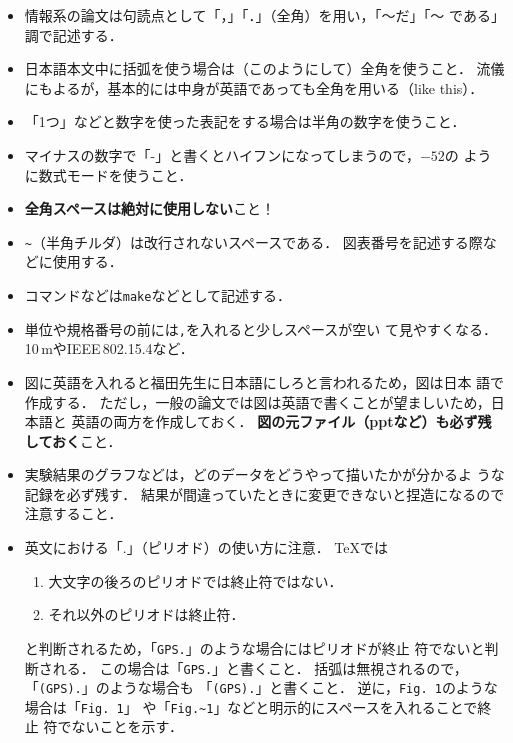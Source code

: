 \begin{itemize}
 \item 情報系の論文は句読点として「，」「．」（全角）を用い，「〜だ」「〜
       である」調で記述する．
 \item 日本語本文中に括弧を使う場合は（このようにして）全角を使うこと．
       流儀にもよるが，基本的には中身が英語であっても全角を用いる（like
       this）．
 \item 「1つ」などと数字を使った表記をする場合は半角の数字を使うこと．
 \item マイナスの数字で「-」と書くとハイフンになってしまうので，$-52$の
       ように数式モードを使うこと．
 \item \textbf{全角スペースは絶対に使用しない}こと！
 \item \texttt{\~}（半角チルダ）は改行されないスペースである．
       図表番号を記述する際などに使用する．
 \item コマンドなどは\texttt{make}などとして記述する．
 \item 単位や規格番号の前には\texttt{\yen ,}を入れると少しスペースが空い
       て見やすくなる．10\,mやIEEE\,802.15.4など．
 \item 図に英語を入れると福田先生に日本語にしろと言われるため，図は日本
       語で作成する．
       ただし，一般の論文では図は英語で書くことが望ましいため，日本語と
       英語の両方を作成しておく．
       \textbf{図の元ファイル（pptなど）も必ず残しておく}こと．
 \item 実験結果のグラフなどは，どのデータをどうやって描いたかが分かるよ
       うな記録を必ず残す．
       結果が間違っていたときに変更できないと捏造になるので注意すること．
 \item 英文における「.」（ピリオド）の使い方に注意．
       TeXでは
       \begin{enumerate}
        \item 大文字の後ろのピリオドでは終止符ではない．
        \item それ以外のピリオドは終止符．
       \end{enumerate}
       と判断されるため，「\texttt{GPS.}」のような場合にはピリオドが終止
       符でないと判断される．
       この場合は「\texttt{GPS\yen@.}」と書くこと．
       括弧は無視されるので，「\texttt{(GPS).}」のような場合も
       「\texttt{(GPS)\yen@.}」と書くこと．
       逆に，\texttt{Fig. 1}のような場合は「\texttt{Fig.\yen\ 1}」
       や「\texttt{Fig.\~{}1}」などと明示的にスペースを入れることで終止
       符でないことを示す．
\end{itemize}

